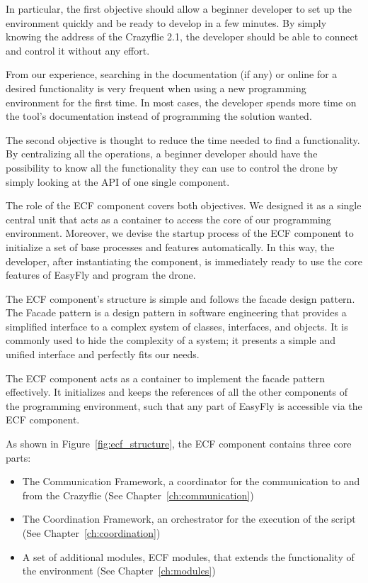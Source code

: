 In particular, the first objective should allow a beginner developer to set up the environment quickly and be ready to develop in a few minutes. 
By simply knowing the address of the Crazyflie 2.1, the developer should be able to connect and control it without any effort.

From our experience, searching in the documentation (if any) or online for a desired functionality is very frequent when using a new programming environment for the first time.
In most cases, the developer spends more time on the tool's documentation instead of programming the solution wanted.

The second objective is thought to reduce the time needed to find a functionality.
By centralizing all the operations, a beginner developer should have the possibility to know all the functionality they can use to control the drone by simply looking at the API of one single component. 

The role of the ECF component covers both objectives. 
We designed it as a single central unit that acts as a container to access the core of our programming environment.
Moreover, we devise the startup process of the ECF component to initialize a set of base processes and features automatically.
In this way, the developer, after instantiating the component, is immediately ready to use the core features of EasyFly and program the drone.

The ECF component's structure is simple and follows the facade design pattern.
The Facade pattern is a design pattern in software engineering that provides a simplified interface to a complex system of classes, interfaces, and objects. 
It is commonly used to hide the complexity of a system; it presents a simple and unified interface and perfectly fits our needs.

The ECF component acts as a container to implement the facade pattern effectively. 
It initializes and keeps the references of all the other components of the programming environment, such that any part of EasyFly is accessible via the ECF component.

As shown in Figure~\ref{fig:ecf_structure}, the ECF component contains three core parts:
\begin{itemize}
    \item The Communication Framework, a coordinator for the communication to and from the Crazyflie (See Chapter~\ref{ch:communication})
    \item The Coordination Framework, an orchestrator for the execution of the script  (See Chapter~\ref{ch:coordination})
    \item A set of additional modules, ECF modules, that extends the functionality of the environment (See Chapter~\ref{ch:modules})
\end{itemize}

